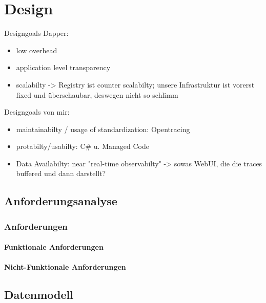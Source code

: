 %

\chapter{Design}

Designgoals Dapper:
\begin{itemize}
	\item low overhead
	\item application level transparency
	\item scalabilty -> Registry ist counter scalabilty; unsere Infrastruktur ist vorerst fixed und überschaubar, deswegen nicht so schlimm
\end{itemize}
Designgoals von mir:
\begin{itemize}
	\item maintainabilty / usage of standardization: Opentracing
	\item protabilty/usabilty: C\# u. Managed Code
	\item Data Availabilty: near "real-time observabilty" -> sowas WebUI, die die traces buffered und dann darstellt?
\end{itemize}
\label{chapter:Design}
\section{Anforderungsanalyse}
\label{section:Anforderungsanalyse}
\subsection{Anforderungen}
\label{subsection:Anforderungen}
\subsubsection{Funktionale Anforderungen}
\label{subsection:Funktionale Anforderungen}
\subsubsection{Nicht-Funktionale Anforderungen}
\label{subsection:Nicht-Funktionale Anforderungen}
\section{Datenmodell}
\label{section:Datenmodell}
